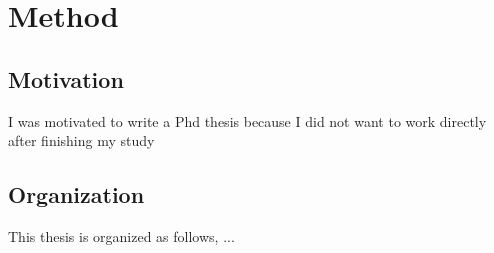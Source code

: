 \chapter{Method}
\section{Motivation}
I was motivated to write a Phd thesis because I did not want to work directly after finishing my study
\section{Organization}
This thesis is organized as follows, ...